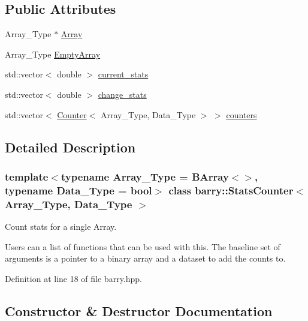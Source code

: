 \subsection*{Public Attributes}
\begin{DoxyCompactItemize}
\item 
Array\+\_\+\+Type $\ast$ \hyperlink{classbarry_1_1_stats_counter_aaf5a82fc09c8ffd2517b1a69680da10d}{Array}
\item 
Array\+\_\+\+Type \hyperlink{classbarry_1_1_stats_counter_ad78463fadfa385a69121c40fdc8fd193}{Empty\+Array}
\item 
std\+::vector$<$ double $>$ \hyperlink{classbarry_1_1_stats_counter_ad99718884cffbeca3cb98d574f6956a1}{current\+\_\+stats}
\item 
std\+::vector$<$ double $>$ \hyperlink{classbarry_1_1_stats_counter_a90b8fddb02b2628cc8d71986f8cdf0ed}{change\+\_\+stats}
\item 
std\+::vector$<$ \hyperlink{classbarry_1_1_counter}{Counter}$<$ Array\+\_\+\+Type, Data\+\_\+\+Type $>$ $>$ \hyperlink{classbarry_1_1_stats_counter_a4f4caa8175df7b60d126af291f6be6cc}{counters}
\end{DoxyCompactItemize}


\subsection{Detailed Description}
\subsubsection*{template$<$typename Array\+\_\+\+Type = B\+Array$<$$>$, typename Data\+\_\+\+Type = bool$>$\newline
class barry\+::\+Stats\+Counter$<$ Array\+\_\+\+Type, Data\+\_\+\+Type $>$}

Count stats for a single Array. 

Users can a list of functions that can be used with this. The baseline set of arguments is a pointer to a binary array and a dataset to add the counts to. 

Definition at line 18 of file barry.\+hpp.



\subsection{Constructor \& Destructor Documentation}
\mbox{\label{classbarry_1_1_stats_counter_aab3d582ee9928340790bdd1b5b2d5f5b}} 
